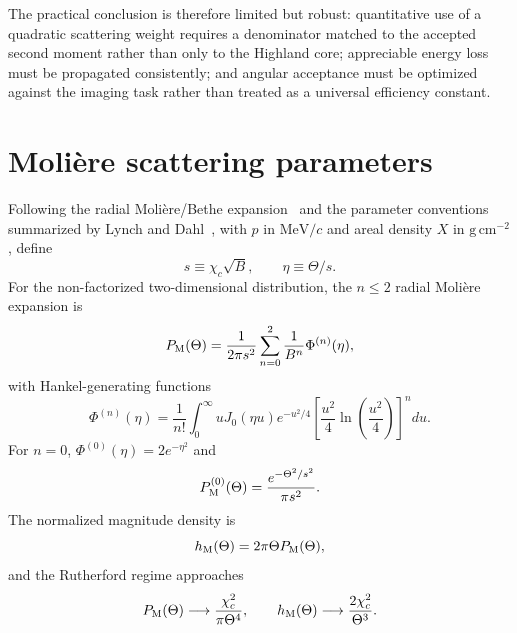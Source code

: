 \documentclass[aps,pra,reprint,longbibliography,floatfix]{revtex4-2}
\newcommand{\chic}{\ensuremath{\chi_c}}
\begin{document}
The practical conclusion is therefore limited but robust: quantitative use of a quadratic scattering weight requires a denominator matched to the accepted second moment rather than only to the Highland core; appreciable energy loss must be propagated consistently; and angular acceptance must be optimized against the imaging task rather than treated as a universal efficiency constant.

\appendix

\section{Moli\`ere scattering parameters}\label{app:moliere}
Following the radial Moli\`ere/Bethe expansion~\cite{moliere1948,bethe1953} and the parameter conventions summarized by Lynch and Dahl~\cite{lynch1991}, with $p$ in $\mathrm{MeV}/c$ and areal density $X$ in $\mathrm{g\,cm^{-2}}$, define
\begin{equation}\label{eq:scale}
s\equiv\chic\sqrt{B},\qquad \eta\equiv\Theta/s.
\end{equation}
For the non-factorized two-dimensional distribution, the $n\le2$ radial Moli\`ere expansion is
\begin{equation}\label{eq:radial_moliere}
P_{\rm M}(\Theta)=\frac{1}{2\pi s^2}
\sum_{n=0}^{2}\frac{1}{B^n}\Phi^{(n)}(\eta),
\end{equation}
with Hankel-generating functions
\begin{equation}\label{eq:hankel_gen}
\Phi^{(n)}(\eta)=\frac{1}{n!}\int_0^\infty uJ_0(\eta u)e^{-u^2/4}
\left[\frac{u^2}{4}\ln\!\left(\frac{u^2}{4}\right)\right]^n du.
\end{equation}
For $n=0$, $\Phi^{(0)}(\eta)=2e^{-\eta^2}$ and
\begin{equation}
P_{\rm M}^{(0)}(\Theta)=\frac{e^{-\Theta^2/s^2}}{\pi s^2}.
\end{equation}
The normalized magnitude density is
\begin{equation}\label{eq:h_moliere}
h_{\rm M}(\Theta)=2\pi\Theta P_{\rm M}(\Theta),
\end{equation}
and the Rutherford regime approaches
\begin{equation}\label{eq:radial_tailnorm}
P_{\rm M}(\Theta)\longrightarrow\frac{\chic^2}{\pi\Theta^4},\qquad
h_{\rm M}(\Theta)\longrightarrow\frac{2\chic^2}{\Theta^3}.
\end{equation}
\end{document}
